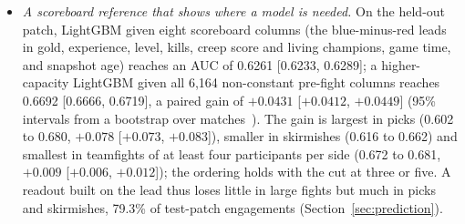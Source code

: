 \begin{itemize}
\item \emph{A scoreboard reference that shows where a model is needed.} On the held-out patch,
  LightGBM given eight scoreboard columns (the blue-minus-red leads in gold, experience, level, kills,
  creep score and living champions, game time, and snapshot age) reaches an AUC of 0.6261 [0.6233,
  0.6289]; a higher-capacity LightGBM given all 6,164 non-constant pre-fight columns reaches 0.6692
  [0.6666, 0.6719], a paired gain of $+0.0431$ [$+0.0412$, $+0.0449$] (95\% intervals from a
  bootstrap over matches~\cite{efron1993bootstrap}). The gain is largest in picks (0.602 to 0.680,
  $+0.078$ [$+0.073$, $+0.083$]), smaller in skirmishes (0.616 to 0.662) and smallest in teamfights of
  at least four participants per side (0.672 to 0.681, $+0.009$ [$+0.006$, $+0.012$]); the ordering holds with the
  cut at three or five. A readout built on the lead thus loses little in large fights but much in picks
  and skirmishes, 79.3\% of test-patch engagements (Section~\ref{sec:prediction}).

\end{itemize}

